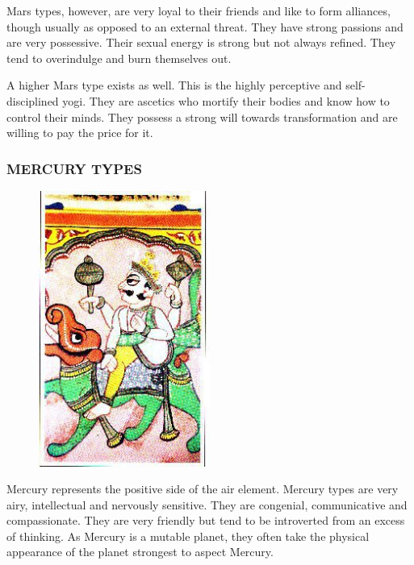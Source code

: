  

Mars types, however, are very loyal to their friends and like to form alliances, though usually as opposed to an external threat. They have strong passions and are very possessive. Their sexual energy is strong but not always refined. They tend to overindulge and burn themselves out.

 

A higher Mars type exists as well. This is the highly perceptive and self-disciplined yogi. They are ascetics who mortify their bodies and know how to control their minds. They possess a strong will towards transformation and are willing to pay the price for it.

 



\subsubsection{MERCURY TYPES}
 

 \begin{figure}[H]
 \centering
\includegraphics[width=0.5\textwidth]{pics/Mercury_type.png}
 \end{figure}
 

Mercury represents the positive side of the air element. Mercury types are very airy, intellectual and nervously sensitive. They are congenial, communicative and compassionate. They are very friendly but tend to be introverted from an excess of thinking. As Mercury is a mutable planet, they often take the physical appearance of the planet strongest to aspect Mercury.

